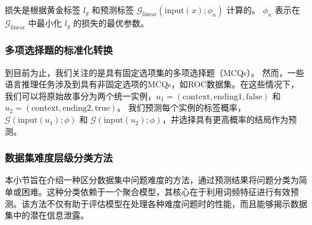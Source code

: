 损失是根据黄金标签 \(l_g\) 和预测标签 \(\mathcal{G}_{\text{linear}}(\text{input}(x); \phi_n)\) 计算的。 \(\phi_n\) 表示在 \(\mathcal{G}_{\text{linear}}\) 中最小化 \(l_g\) 的损失的最优参数。

\subsubsection{多项选择题的标准化转换}
\label{sec4:dynamic}

到目前为止，我们关注的是具有固定选项集的多项选择题（MCQs）。
然而，一些语言推理任务涉及到具有非固定选项的MCQs，如ROC数据集。在这些情况下，
我们可以将原始故事分为两个统一实例，\(u_1=(\text{context}, \text{ending1}, \text{false})\) 和 \(u_2=(\text{context}, \text{ending2}, \text{true})\)。
我们预测每个实例的标签概率，\(\mathcal{G}(\text{input}(u_1); \phi)\) 和 \(\mathcal{G}(\text{input}(u_2); \phi)\)，并选择具有更高概率的结局作为预测。


\subsubsection{数据集难度层级分类方法}
本小节旨在介绍一种区分数据集中问题难度的方法，通过预测结果将问题分类为简单或困难。这种分类依赖于一个聚合模型，其核心在于利用词频特征进行有效预测。该方法不仅有助于评估模型在处理各种难度问题时的性能，而且能够揭示数据集中的潜在信息泄露。

